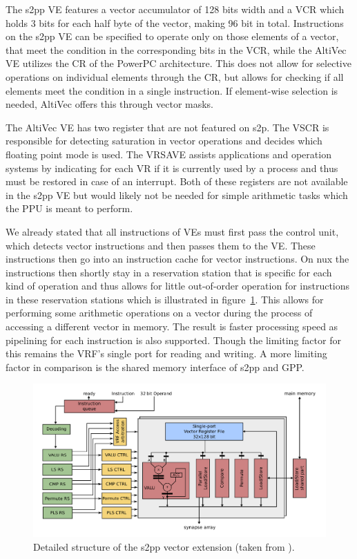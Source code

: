 The s2pp \ac{VE} features a vector accumulator of 128 bits width and a \ac{VCR} which holds 3 bits for each half byte of the vector, making 96 bit in total.
Instructions on the s2pp \ac{VE} can be specified to operate only on those elements of a vector, that meet the condition in the corresponding bits in the \ac{VCR}, while the AltiVec \ac{VE} utilizes the \ac{CR} of the PowerPC architecture.
This does not allow for selective operations on individual elements through the \ac{CR}, but allows for checking if all elements meet the condition in a single instruction.
If element-wise selection is needed, AltiVec offers this through vector masks.
    
The AltiVec \ac{VE} has two register that are not featured on s2p.
The \ac{VSCR} is responsible for detecting saturation in vector operations and decides which floating point mode is used.
The \ac{VRSAVE} assists applications and operation systems by indicating for each \ac{VR} if it is currently used by a process and thus must be restored in case of an interrupt.
Both of these registers are not available in the s2pp \ac{VE} but would likely not be needed for simple arithmetic tasks which the \ac{PPU} is meant to perform.

We already stated that all instructions of \ac{VE}s must first pass the control unit, which detects vector instructions and then passes them to the \ac{VE}.
These instructions then go into an instruction cache for vector instructions. 
On nux the instructions then shortly stay in a reservation station that is specific for each kind of operation and thus allows for little out-of-order operation for instructions in these reservation stations which is illustrated in figure~\ref{fig:s2pp}.
This allows for performing some arithmetic operations on a vector during the process of accessing a different vector in memory.
The result is faster processing speed as pipelining for each instruction is also supported.
Though the limiting factor for this remains the \ac{VRF}'s single port for reading and writing.
A more limiting factor in comparison is the shared memory interface of s2pp and \ac{GPP}.
\begin{figure}[htbp]
    \centering
    \includegraphics[width=\textwidth]{pictures/s2pp.png}
    \caption{\label{fig:s2pp} Detailed structure of the s2pp vector extension (taken from \cite{PPU}).}
\end{figure}

